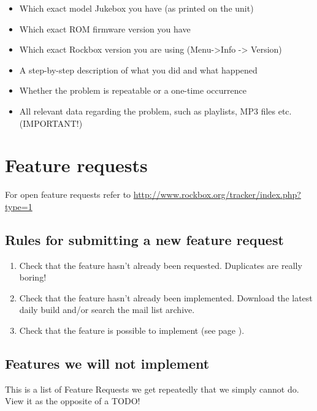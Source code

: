 \begin{itemize}
\item  Which exact model Jukebox you have (as printed on the unit)
\item  Which exact ROM firmware version you have
\item  Which exact Rockbox version you are using
(Menu{}-{\textgreater}Info {}-{\textgreater} Version)
\item  A step{}-by{}-step description of what you did and what happened
\item  Whether the problem is repeatable or a one{}-time occurrence
\item  All relevant data regarding the problem, such as playlists, MP3
files etc. (IMPORTANT!) 
\end{itemize}

\section{Feature requests}
For open feature requests refer to
\url{http://www.rockbox.org/tracker/index.php?type=1}

\subsection{Rules for submitting a new feature request}

\begin{enumerate}
\item Check that the feature hasn't already been requested. 
  Duplicates are really boring!
\item Check that the feature hasn't already been implemented. 
  Download the latest daily build and/or search the mail list archive.
\item Check that the feature is possible to implement (see page \pageref{ref:NODO}).
\end{enumerate}

\subsection{\label{ref:NODO}Features we will not implement}
This is a list of Feature Requests we get repeatedly that we simply
cannot do. View it as the opposite of a TODO!

